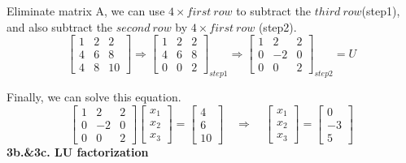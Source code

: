 \documentclass{article}
\begin{document}
Eliminate matrix A, we can use $4\times first\ row$ to subtract the $third\ row$(step1), and also subtract the $second\ row$ by $4\times first\ row$ (step2).
\[
{\begin{bmatrix}
1 & 2 & 2\\
4 & 6 & 8\\
4 & 8 & 10
\end{bmatrix}}
\Rightarrow
{\begin{bmatrix}
1 & 2 & 2\\
4 & 6 & 8\\
0 & 0 & 2
\end{bmatrix}}_{step1}
\Rightarrow
{\begin{bmatrix}
1 & 2 & 2\\
0 &-2 & 0\\
0 & 0 & 2
\end{bmatrix}}_{step2}
=U
\]

Finally, we can solve this equation.
\[
{\begin{bmatrix}
1 & 2 & 2\\
0 &-2 & 0\\
0 & 0 & 2
\end{bmatrix}}
{\begin{bmatrix}
x_1\\
x_2\\
x_3
\end{bmatrix}}
=
{\begin{bmatrix}
4\\
6\\
10
\end{bmatrix}}
\quad
\Rightarrow
\quad
{\begin{bmatrix}
x_1\\
x_2\\
x_3
\end{bmatrix}}
=
{\begin{bmatrix}
0\\
-3\\
5
\end{bmatrix}}
\]
\textbf{3b.\&3c. LU factorization}\\
\end{document}
